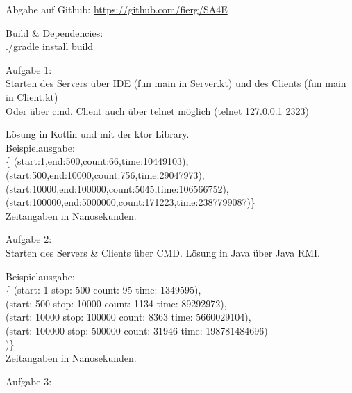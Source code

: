 \documentclass[10pt,a4paper]{article}
\begin{document}
	
\begin{boxedminipage}[t][17cm][t]{\textwidth}
	\par{
	Abgabe auf Github:
	\url{https://github.com/fierg/SA4E}
	
	\medskip
	
	Build \& Dependencies:\\
	./gradle install build\\
}

	\par{

	
	Aufgabe 1:\\
	Starten des Servers über IDE (fun main in Server.kt) und des Clients (fun main in Client.kt)\\
	Oder über cmd.
	Client auch über telnet möglich (telnet 127.0.0.1 2323)
	
	
	Lösung in Kotlin und mit der ktor Library.\\
	Beispielausgabe:\\
	\{ (start:1,end:500,count:66,time:10449103),\\
	(start:500,end:10000,count:756,time:29047973),\\
	(start:10000,end:100000,count:5045,time:106566752),\\
	(start:100000,end:5000000,count:171223,time:2387799087)\}\\
	
	Zeitangaben in Nanosekunden.\\
}


	\par{
		Aufgabe 2:\\
		Starten des Servers & Clients über CMD.
		Lösung in Java über Java RMI.
		
		Beispielausgabe:\\
	\{ (start: 1 stop: 500 count: 95 time: 1349595),\\
(start: 500 stop: 10000 count: 1134 time: 89292972),\\
(start: 10000 stop: 100000 count: 8363 time: 5660029104),\\
(start: 100000 stop: 500000 count: 31946 time: 198781484696)\\
)\}\\
	
	Zeitangaben in Nanosekunden.\\
		
	}
	
	
	\par{
	Aufgabe 3:\\
	
}
	
\end{boxedminipage}	
\end{document}
